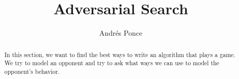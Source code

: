 \documentclass{tufte-handout}
\title{Adversarial Search}
\author{Andr\'es Ponce}
\begin{document}
\begin{abstract}
In this section, we want to find the best ways to write an
algorithm that plays a game. We try to model an opponent and try 
to ask what ways we can use to model the opponent's behavior.
\end{abstract}
\end{document}
